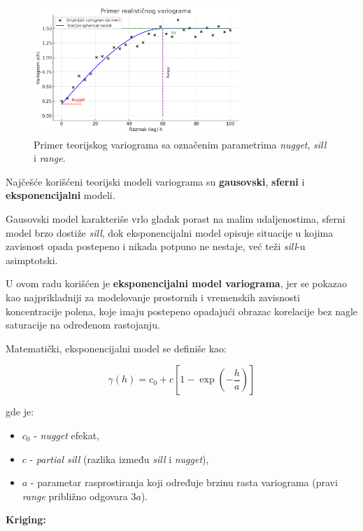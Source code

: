 \documentclass[12pt]{article}
\begin{document}
\begin{figure}[H]
    \centering
    \includegraphics[width=0.7\textwidth]{stkriging/primer.png}
    \caption{Primer teorijskog variograma sa označenim parametrima \textit{nugget}, \textit{sill} i \textit{range}.}
    \label{fig:primer_variogram}
\end{figure}

Najčešće korišćeni teorijski modeli variograma su \textbf{gausovski}, \textbf{sferni} i \textbf{eksponencijalni} modeli.

Gausovski model karakteriše vrlo gladak porast na malim udaljenostima, sferni model brzo dostiže \textit{sill}, dok eksponencijalni model opisuje situacije u kojima zavisnost opada postepeno i nikada potpuno ne nestaje, već teži \textit{sill}-u asimptotski.

U ovom radu korišćen je \textbf{eksponencijalni model variograma}, jer se pokazao kao najprikladniji za modelovanje prostornih i vremenskih zavisnosti koncentracije polena, koje imaju postepeno opadajući obrazac korelacije bez nagle saturacije na određenom rastojanju.

Matematički, eksponencijalni model se definiše kao:

\begin{equation}
\gamma(h) = c_0 + c \left[ 1 - \exp \left( -\frac{h}{a} \right) \right]
\end{equation}

gde je:
\begin{itemize}
\item $c_0$ - \textit{nugget} efekat,
\item $c$ - \textit{partial sill} (razlika između \textit{sill} i \textit{nugget}),
\item $a$ - parametar rasprostiranja koji određuje brzinu rasta variograma (pravi \textit{range} približno odgovara $3a$).
\end{itemize}

\textbf{Kriging:}
\end{document}
